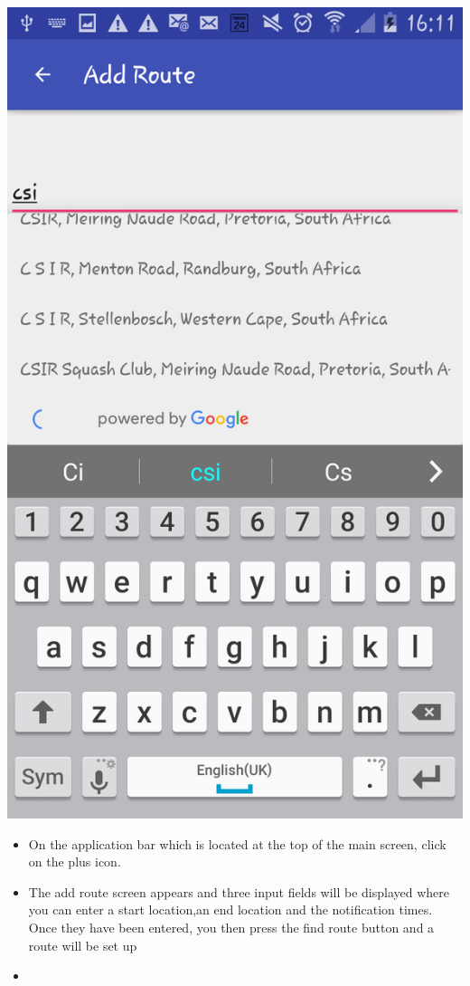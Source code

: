 \documentclass[a4paper,12pt]{article}
\begin{document}
\includegraphics[width=\textwidth]{images/AddRoute2.png}
\begin{itemize}
    \item On the application bar which is located at the top of the main screen, click on the plus icon.
    \item The add route screen appears and three input fields will be displayed  where you can enter a start location,an end location and the notification times. Once they have been entered, you then press the find route button and a route will be set up
    \item 
\end{itemize}
\end{document}
